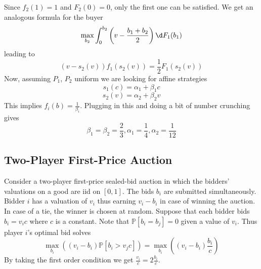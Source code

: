 \documentclass[a4paper, 12pt]{article}
\theoremstyle{plain}
\theoremstyle{definition}
\theoremstyle{lemma}
\theoremstyle{remark}
\theoremstyle{corollary}
\theoremstyle{example}
\begin{document}
	Since $f_2(1) = 1$ and $F_2(0) = 0$, only the first one can be satisfied. We get an analogous formula for the buyer \[\max_{b_2} \int_0^{b_2} \left(v-\frac{b_1+b_2}{2}\right) \d F_1(b_1)\] leading to \[(v-s_2(v))f_1(s_2(v)) = \frac{1}{2} F_1(s_2(v))\]
	Now, assuming $P_1$, $P_2$ uniform we are looking for affine strategies \[s_1(c) = \alpha_1 + \beta_1c\]\[s_2(v) = \alpha_2 + \beta_2v\] This implies $f_i(b) = \frac{1}{\beta_i}$. Plugging in this and doing a bit of number crunching gives \[\beta_1 = \beta_2 = \frac{2}{3}, \alpha_1 = \frac{1}{4}, \alpha_2 = \frac{1}{12}\]
	\subsection{Two-Player First-Price Auction}
	Consider a two-player first-price sealed-bid auction in which the bidders' valuations on a good are iid on $[0,1]$. The bids $b_i$ are submitted simultaneously. Bidder $i$ has a valuation of $v_i$ thus earning $v_i-b_i$ in case of winning the auction. In case of a tie, the winner is chosen at random. Suppose that each bidder bids $b_i = v_ic$ where $c$ is a constant. Note that $\mathbb{P}[b_i = b_j] = 0$ given a value of $v_i$. Thus player $i$'s optimal bid solves \[\max_{b_i} ((v_i-b_i)\mathbb{P}[b_i > v_jc]) = \max_{b_i} ((v_i-b_i)\frac{b_i}{c})\] By taking the first order condition we get $\frac{v_i}{c} = 2\frac{b_i}{c}$.
\end{document}
